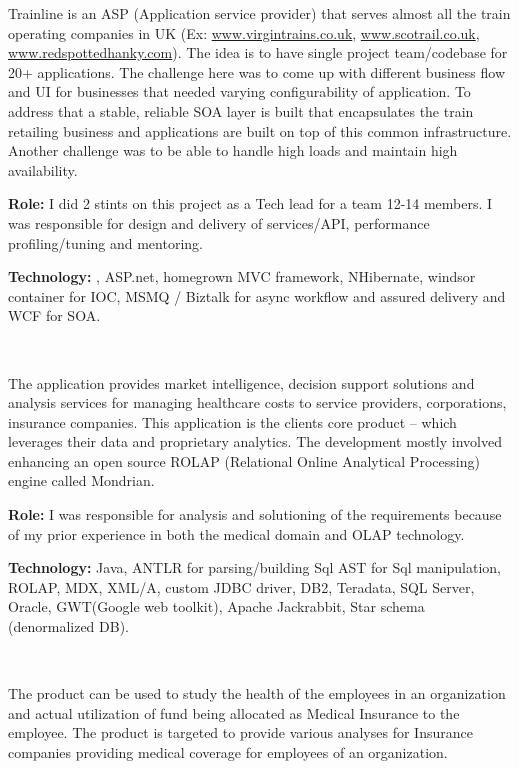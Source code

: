 \begin{resume}
\begin{position}
Trainline is an ASP (Application service provider) that serves almost all the train operating companies in UK (Ex: \url{www.virgintrains.co.uk}, \url{www.scotrail.co.uk}, \url{www.redspottedhanky.com}). The idea is to have single project team/codebase for 20+ applications. The challenge here was to come up with different business flow and UI for businesses that needed varying configurability of application. To address that a stable, reliable SOA layer is built that encapsulates the train retailing business and applications are built on top of this common infrastructure. Another challenge was to be able to handle high loads and maintain high availability.

{\textbf{Role:}} I did 2 stints on this project as a Tech lead for a team 12-14 members. I was responsible for design and delivery of services/API, performance profiling/tuning and mentoring.

{\textbf{Technology:}} \CSharp, ASP.net, homegrown MVC framework, NHibernate,  windsor container for IOC, MSMQ / Biztalk for async workflow and assured delivery and WCF for SOA.
\end{position}\\


\begin{position}
The application provides market intelligence, decision support solutions and analysis services for managing healthcare costs to service providers, corporations, insurance companies. This application is the clients core product – which leverages their data and proprietary analytics. The 
development mostly involved enhancing an open source ROLAP (Relational Online Analytical Processing) engine called Mondrian. 

{\textbf{Role:}} I was responsible for analysis and solutioning of the requirements because of my prior experience in both the medical domain and OLAP technology. 

{\textbf{Technology:}} Java, ANTLR for parsing/building Sql AST for Sql manipulation, ROLAP, MDX, XML/A, custom JDBC driver, DB2, Teradata, SQL Server, Oracle, GWT(Google web toolkit), Apache Jackrabbit, Star schema (denormalized DB).
\end{position}\\

\begin{position}
The product can be used to study the health of the employees in an organization and actual utilization of fund being allocated as Medical Insurance to the employee. The product is targeted to provide various analyses for Insurance companies providing medical coverage for employees of an organization.


\end{position}
\end{resume}
